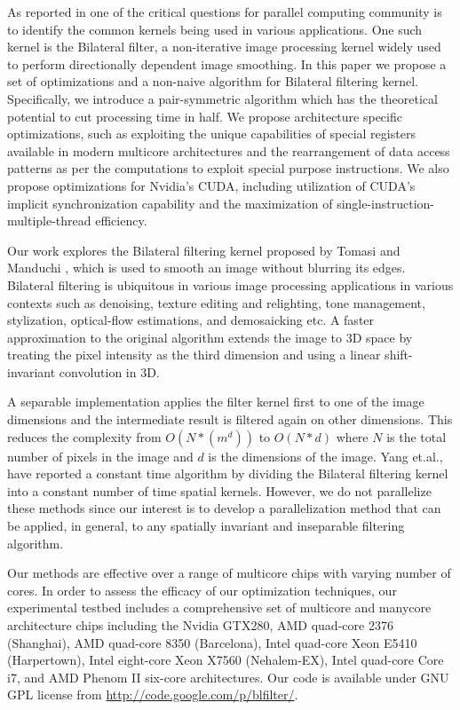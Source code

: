 \documentclass{IEEEtran}
\begin{document}
As reported in \cite{landscapeofpc} one of the critical questions for parallel computing community is to identify the common kernels being used in various applications. One such kernel is the Bilateral filter, a non-iterative image processing kernel widely used to perform directionally dependent image smoothing. In this paper we propose a set of optimizations and a non-naive algorithm for Bilateral filtering kernel. Specifically, we introduce a pair-symmetric algorithm which has the theoretical potential to cut processing time in half. We propose architecture specific optimizations, such as exploiting the unique capabilities of special registers available in modern multicore architectures and the rearrangement of data access patterns as per the computations to exploit special purpose instructions. We also propose optimizations for Nvidia's CUDA, including utilization of CUDA's implicit synchronization capability and the maximization of single-instruction-multiple-thread efficiency. 

Our work explores the Bilateral filtering kernel proposed by Tomasi and Manduchi \cite{Tomasi1998}, which is used to smooth an image without blurring its edges. Bilateral filtering is ubiquitous in various image processing applications in various contexts such as denoising\cite{zhang2008}, texture editing and relighting\cite{eisemann2004}, tone management\cite{Bae2006}, stylization\cite{DeCarlo2002}, optical-flow estimations\cite{Xiao2006}, and demosaicking\cite{Ramanath2003} etc. A faster approximation to the original algorithm \cite{Paris2009} extends the image to 3D space by treating the pixel intensity as the third dimension and using a linear shift-invariant convolution in 3D. 

A separable implementation \cite{Pham2005} applies the filter kernel first to one of the image dimensions and the intermediate result is filtered again on other dimensions. This reduces the complexity from $O(N*(m^{d}))$ to $O(N*d)$ where $N$ is the total number of pixels in the image and $d$ is the dimensions of the image. Yang et.al.\cite{yang2009}, have reported a constant time algorithm by dividing the Bilateral filtering kernel into a constant number of time spatial kernels. However, we do not parallelize these methods since our interest is to develop a parallelization method that can be applied, in general, to any spatially invariant and inseparable filtering algorithm. 

Our methods are effective over a range of multicore chips with varying number of cores. In order to assess the efficacy of our optimization techniques, our experimental testbed includes a comprehensive set of multicore and manycore architecture chips including the Nvidia GTX280, AMD quad-core 2376 (Shanghai), AMD quad-core 8350 (Barcelona), Intel quad-core Xeon E5410 (Harpertown), Intel eight-core Xeon X7560 (Nehalem-EX), Intel quad-core Core i7, and AMD Phenom II six-core architectures. Our code is available under GNU GPL license from \url{http://code.google.com/p/blfilter/}.
\end{document}
